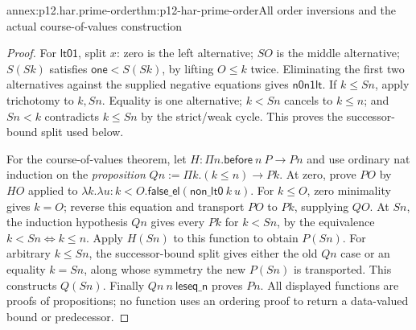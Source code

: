 \begin{annexitem}{annex:p12.har.prime-order}{thm:p12-har-prime-order}{All order inversions and the actual course-of-values construction}
\begin{proof}
For \(\mathsf{lt01}\), split \(x\): zero is the left alternative;
\(S O\) is the middle alternative; \(S(S k)\) satisfies
\(\mathsf{one}<S(S k)\), by lifting \(O\le k\) twice.
Eliminating the first two alternatives against the supplied negative
equations gives \(\mathsf{n0n1lt}\).
If \(k\le S n\), apply trichotomy to \(k,S n\). Equality is one
alternative; \(k<S n\) cancels to \(k\le n\); and
\(S n<k\) contradicts \(k\le S n\) by the strict/weak cycle.
This proves the successor-bound split used below.

For the course-of-values theorem, let
\(H:\Pi n.\mathsf{before}\ n\ P\to P n\) and use ordinary nat
induction on the \emph{proposition}
\(Q n:=\Pi k.(k\le n)\to P k\). At zero, prove \(P O\)
by \(H O\) applied to \(\lambda k.\lambda u:k<O.
\mathsf{false\_el}(\mathsf{non\_lt0}\ k\ u)\).
For \(k\le O\), zero minimality gives \(k=O\); reverse this
equation and transport \(P O\) to \(P k\), supplying \(Q O\).
At \(S n\), the induction hypothesis \(Q n\) gives every
\(P k\) for \(k<S n\), by the equivalence \(k<S n\iff k\le n\).
Apply \(H(S n)\) to this function to obtain \(P(S n)\).
For arbitrary \(k\le S n\), the successor-bound split gives
either the old \(Q n\) case or an equality \(k=S n\), along whose
symmetry the new \(P(S n)\) is transported. This constructs
\(Q(S n)\). Finally \(Q n\ n\ \mathsf{leseq\_n}\) proves \(P n\).
All displayed functions are proofs of propositions; no function uses
an ordering proof to return a data-valued bound or predecessor.
\end{proof}
\end{annexitem}

